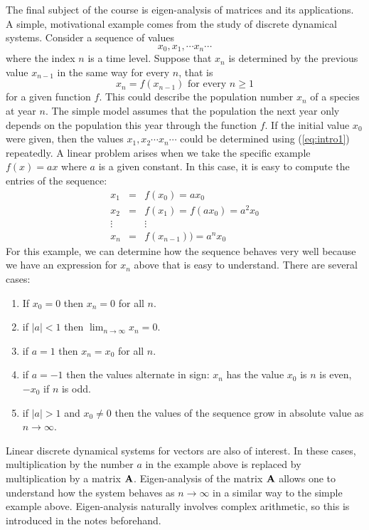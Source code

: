 The final subject of the course is eigen-analysis of matrices and its
applications. A simple, motivational example comes from the study of
discrete dynamical systems. Consider a sequence of values 
\[
x_0, x_1, \cdots x_n \cdots
\]
where the index $n$ is a time level. Suppose that $x_n$ is determined
by the previous value $x_{n-1}$ in the same way for every $n$, that is
\begin{equation}
\label{eq:intro1}
x_n = f(x_{n-1}) \mbox{\ \ for every $n \geq1 $} 
\end{equation}
for a given function $f$. This could describe the population number $x_n$
of a species at year $n$. The simple model assumes that the population 
the next year only depends on the population this year through the 
function $f$. 
If the initial value $x_0$ were given, then
the values $x_1, x_2 \cdots x_n \cdots$ could be determined using
(\ref{eq:intro1}) repeatedly. A linear problem arises when we take the
specific example $f(x) = ax$ where $a$ is a given constant. In this
case, it is easy to compute the entries of the sequence:
\begin{eqnarray*}
x_1 & = & f(x_0) = a x_0 \\ 
x_2 & = & f(x_1) = f(a x_0) = a^2 x_0 \\ 
\vdots & & \vdots \\
x_n & = & f(x_{n-1})) = a^n x_0
\end{eqnarray*}
For this example, we can determine how the sequence behaves very well
because we have an expression for $x_n$ above that is easy to
understand. There are several cases:
\begin{enumerate}
\item If $x_0 = 0$ then $x_n =0$ for all $n$. 
\item if $|a|< 1$ then $\lim_{n \rightarrow \infty} x_n = 0$.
\item if $a=1$ then $x_n = x_0$ for all $n$.
\item if $a=-1$ then the values alternate in sign: $x_n$ has the value
$x_0$ is $n$ is even, $-x_0$ if $n$ is odd.
\item if $|a|>1$ and $x_0 \neq 0$ then the values of the sequence grow
in absolute value as $n \rightarrow \infty$.
\end{enumerate}

Linear discrete dynamical systems for vectors are also of interest. In
these cases, multiplication by the number $a$ in the example above is
replaced by multiplication by a matrix $\bf A$. Eigen-analysis of the
matrix $\bf A$ allows one to understand how the system behaves as $n
\rightarrow \infty$ in a similar way to the simple example above. Eigen-analysis naturally involves complex arithmetic, so this is introduced in the notes beforehand. 

